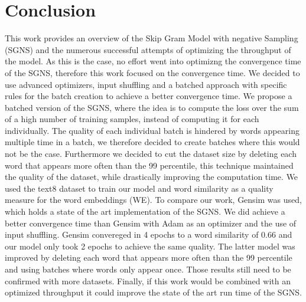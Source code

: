 
\section{Conclusion}\label{sec:conclusion}

This work provides an overview of the Skip Gram Model with negative Sampling (SGNS) and the numerous successful attempts of optimizing the throughput of the model. As this is the case, no effort went into optimizng the convergence time of the SGNS, therefore this work focused on the convergence time. We decided to use advanced optimizers, input shuffling and a batched approach with specific rules for the batch creation to achieve a better convergence time. We propose a batched version of the SGNS, where the idea is to compute the loss over the sum of a high number of training samples,  instead of computing it for each individually. The quality of each individual batch is hindered by words appearing multiple time in a batch, we therefore decided to create batches where this would not be the case. Furthermore we  decided to cut the dataset size by deleting each word that appears more often than the 99 percentile, this technique maintained the quality of the dataset, while drastically improving the computation time. We used the text8 dataset to train our model and  word similarity as a quality measure for the word embeddings (WE).
To compare our work, Gensim was used, which holds a state of the art implementation of the SGNS. We did achieve a better convergence time than Gensim with Adam as an optimizer and the use of input shuffling. Gensim convereged in 4 epochs to a word similarity of 0.66 and our model only took 2 epochs to achieve the same quality. The latter model was improved by deleting each  word that appears more often than the 99 percentile and using batches where words only appear once. Those results still need to be confirmed with more datasets. Finally, if this work would be combined with an optimized throughput it  could improve the state of the art run time of the SGNS.